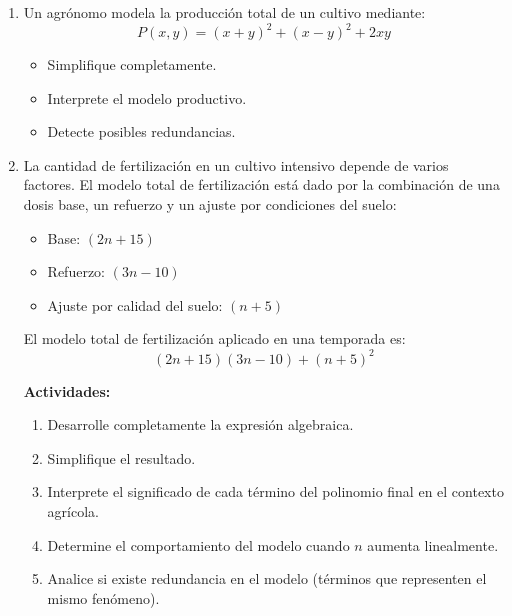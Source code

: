 \documentclass[11pt]{article}
\begin{document}
\begin{enumerate}
		El segundo análisis corresponde al estudio de la estructura y compactación del suelo:
		\[
		(2a - b)(3a + 14b)
		\]
		
		\textbf{Actividades:}
		\begin{enumerate}[label=\alph*)]
			\item Desarrolle algebraicamente cada una de las expresiones.
			\item Compare los costos individuales de cada análisis.
			\item Verifique si la suma de los costos individuales coincide con el costo total.
			\item Analice posibles inconsistencias en el modelo propuesto.
		\end{enumerate}
		
		
		\item Un agrónomo modela la producción total de un cultivo mediante:
		\[
		P(x,y) = (x+y)^2 + (x-y)^2 + 2xy
		\]
		
		\begin{itemize}
			\item Simplifique completamente.
			\item Interprete el modelo productivo.
			\item Detecte posibles redundancias.
		\end{itemize}
		
		
		
		\item La cantidad de fertilización en un cultivo intensivo depende de varios factores. El modelo total de fertilización está dado por la combinación de una dosis base, un refuerzo y un ajuste por condiciones del suelo:
		
		\begin{itemize}
			\item Base: $(2n + 15)$
			\item Refuerzo: $(3n - 10)$
			\item Ajuste por calidad del suelo: $(n + 5)$
		\end{itemize}
		
		El modelo total de fertilización aplicado en una temporada es:
		\[
		(2n + 15)(3n - 10) + (n + 5)^2
		\]
		
		\textbf{Actividades:}
		\begin{enumerate}[label=\alph*)]
			\item Desarrolle completamente la expresión algebraica.
			\item Simplifique el resultado.
			\item Interprete el significado de cada término del polinomio final en el contexto agrícola.
			\item Determine el comportamiento del modelo cuando $n$ aumenta linealmente.
			\item Analice si existe redundancia en el modelo (términos que representen el mismo fenómeno).
		\end{enumerate}
		
		
	\end{enumerate}
	
\end{document}
